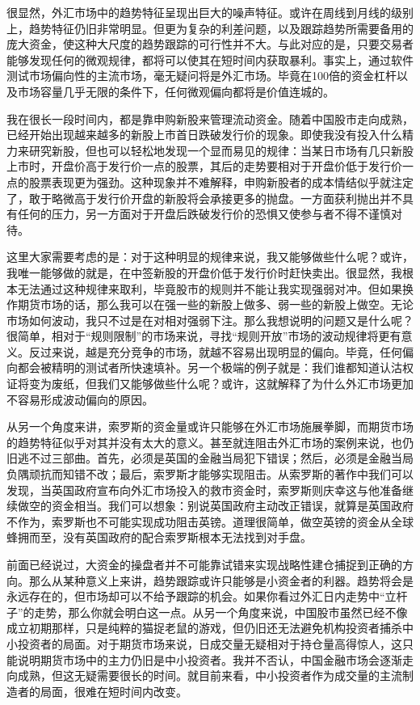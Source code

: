 很显然，外汇市场中的趋势特征呈现出巨大的噪声特征。或许在周线到月线的级别上，趋势特征仍旧非常明显。但更为复杂的利差问题，以及跟踪趋势所需要备用的庞大资金，使这种大尺度的趋势跟踪的可行性并不大。与此对应的是，只要交易者能够发现任何的微观规律，都将可以使其在短时间内获取暴利。事实上，通过软件测试市场偏向性的主流市场，毫无疑问将是外汇市场。毕竟在100倍的资金杠杆以及市场容量几乎无限的条件下，任何微观偏向都将是价值连城的。

我在很长一段时间内，都是靠申购新股来管理流动资金。随着中国股市走向成熟，已经开始出现越来越多的新股上市首日跌破发行价的现象。即使我没有投入什么精力来研究新股，但也可以轻松地发现一个显而易见的规律：当某日市场有几只新股上市时，开盘价高于发行价一点的股票，其后的走势要相对于开盘价低于发行价一点的股票表现更为强劲。这种现象并不难解释，申购新股者的成本情结似乎就注定了，敢于略微高于发行价开盘的新股将会承接更多的抛盘。一方面获利抛出并不具有任何的压力，另一方面对于开盘后跌破发行价的恐惧又使参与者不得不谨慎对待。

这里大家需要考虑的是：对于这种明显的规律来说，我又能够做些什么呢？或许，我唯一能够做的就是，在中签新股的开盘价低于发行价时赶快卖出。很显然，我根本无法通过这种规律来取利，毕竟股市的规则并不能让我实现强弱对冲。但如果换作期货市场的话，那么我可以在强一些的新股上做多、弱一些的新股上做空。无论市场如何波动，我只不过是在对相对强弱下注。那么我想说明的问题又是什么呢？很简单，相对于“规则限制”的市场来说，寻找“规则开放”市场的波动规律将更有意义。反过来说，越是充分竞争的市场，就越不容易出现明显的偏向。毕竟，任何偏向都会被精明的测试者所快速填补。另一个极端的例子就是：我们谁都知道认沽权证将变为废纸，但我们又能够做些什么呢？或许，这就解释了为什么外汇市场更加不容易形成波动偏向的原因。

从另一个角度来讲，索罗斯的资金量或许只能够在外汇市场施展拳脚，而期货市场的趋势特征似乎对其并没有太大的意义。甚至就连阻击外汇市场的案例来说，也仍旧逃不过三部曲。首先，必须是英国的金融当局犯下错误；然后，必须是金融当局负隅顽抗而知错不改；最后，索罗斯才能够实现阻击。从索罗斯的著作中我们可以发现，当英国政府宣布向外汇市场投入的救市资金时，索罗斯则庆幸这与他准备继续做空的资金相当。我们可以想象：别说英国政府主动改正错误，就算是英国政府不作为，索罗斯也不可能实现成功阻击英镑。道理很简单，做空英镑的资金从全球蜂拥而至，没有英国政府的配合索罗斯根本无法找到对手盘。

前面已经说过，大资金的操盘者并不可能靠试错来实现战略性建仓捕捉到正确的方向。那么从某种意义上来讲，趋势跟踪或许只能够是小资金者的利器。趋势将会是永远存在的，但市场却可以不给予跟踪的机会。如果你看过外汇日内走势中“立杆子”的走势，那么你就会明白这一点。从另一个角度来说，中国股市虽然已经不像成立初期那样，只是纯粹的猫捉老鼠的游戏，但仍旧还无法避免机构投资者捕杀中小投资者的局面。对于期货市场来说，日成交量无疑相对于持仓量高得惊人，这只能说明期货市场中的主力仍旧是中小投资者。我并不否认，中国金融市场会逐渐走向成熟，但这无疑需要很长的时间。就目前来看，中小投资者作为成交量的主流制造者的局面，很难在短时间内改变。

